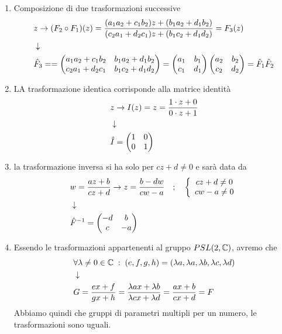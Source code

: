 \begin{enumerate}
	\item Composizione di due trasformazioni successive
	\begin{align}
		&z \to (F_2 \circ F_1)(z) = \frac{(a_1 a_2 + c_1b_2)z + (b_1a_2 + d_1 b_2)}{(c_2 a_1 + d_2c_1)z + (b_1c_2 + d_1 d_2)} = F_3(z) \\ &\downarrow \nonumber \\
		&\hat{F}_3 == \begin{pmatrix}
			a_1 a_2 + c_1b_2 & b_1a_2 + d_1 b_2 \\
			c_2 a_1 + d_2c_1 & b_1c_2 + d_1 d_2
		\end{pmatrix} = \begin{pmatrix}
			a_1 & b_1 \\
			c_1 & d_1
		\end{pmatrix}\begin{pmatrix}
			a_2 & b_2 \\
			c_2 & d_2
		\end{pmatrix} = \hat{F}_1 \hat{F}_2
	\end{align}
	\item LA trasformazione identica corrisponde alla matrice identità
	\begin{align}
		&z \to I(z) = z = \frac{1 \cdot z + 0 }{0 \cdot z + 1} \\ &\downarrow \nonumber \\
		&\hat{I} = \begin{pmatrix}
			1 & 0 \\
			0 & 1
		\end{pmatrix}
	\end{align}
	\item la trasformazione inversa si ha solo per $cz + d \neq 0$ e sarà data da
	\begin{align}
		&w = \frac{az + b}{cz +d} \to z =\frac{b - dw}{cw - a} \quad ; \quad \left\{ \begin{array}{cc} cz + d \neq 0\\ cw -a \neq 0 \end{array} \right.\\ &\downarrow \nonumber \\
		&\hat{F}^{-1}  = \begin{pmatrix}
			-d & b \\
			c & -a
		\end{pmatrix}
	\end{align}
	\item Essendo le trasformazioni appartenenti al gruppo $PSL(2,\mathbb{C})$, avremo che 
	\begin{align}
		&\forall \lambda\neq 0 \in \mathbb{C} \; : \; (e,f,g,h) = (\lambda a,\lambda a,\lambda b,\lambda c,\lambda d)\\ &\downarrow \nonumber \\
		&G=\frac{ex + f}{gx + h} = \frac{\lambda ax + \lambda b}{\lambda cx + \lambda d } =\frac{ax + b}{cx + d} = F
	\end{align}
 	Abbiamo quindi che gruppi di parametri multipli per un numero, le trasformazioni sono uguali.
\end{enumerate}

